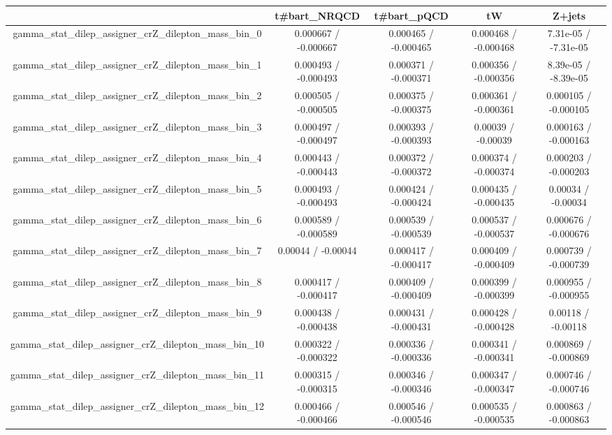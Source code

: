 \documentclass[10pt]{article}
\begin{document}
\begin{table}[htbp]
\begin{center}
\begin{tabular}{|c|c|c|c|c|}
\hline 
      & t#bar{t}_{NRQCD}      & t#bar{t}_{pQCD}      & tW      & Z+jets \\ 
\hline 
  gamma_stat_dilep_assigner_crZ_dilepton_mass_bin_0 & 0.000667 / -0.000667 & 0.000465 / -0.000465 & 0.000468 / -0.000468 & 7.31e-05 / -7.31e-05 \\ 
  gamma_stat_dilep_assigner_crZ_dilepton_mass_bin_1 & 0.000493 / -0.000493 & 0.000371 / -0.000371 & 0.000356 / -0.000356 & 8.39e-05 / -8.39e-05 \\ 
  gamma_stat_dilep_assigner_crZ_dilepton_mass_bin_2 & 0.000505 / -0.000505 & 0.000375 / -0.000375 & 0.000361 / -0.000361 & 0.000105 / -0.000105 \\ 
  gamma_stat_dilep_assigner_crZ_dilepton_mass_bin_3 & 0.000497 / -0.000497 & 0.000393 / -0.000393 & 0.00039 / -0.00039 & 0.000163 / -0.000163 \\ 
  gamma_stat_dilep_assigner_crZ_dilepton_mass_bin_4 & 0.000443 / -0.000443 & 0.000372 / -0.000372 & 0.000374 / -0.000374 & 0.000203 / -0.000203 \\ 
  gamma_stat_dilep_assigner_crZ_dilepton_mass_bin_5 & 0.000493 / -0.000493 & 0.000424 / -0.000424 & 0.000435 / -0.000435 & 0.00034 / -0.00034 \\ 
  gamma_stat_dilep_assigner_crZ_dilepton_mass_bin_6 & 0.000589 / -0.000589 & 0.000539 / -0.000539 & 0.000537 / -0.000537 & 0.000676 / -0.000676 \\ 
  gamma_stat_dilep_assigner_crZ_dilepton_mass_bin_7 & 0.00044 / -0.00044 & 0.000417 / -0.000417 & 0.000409 / -0.000409 & 0.000739 / -0.000739 \\ 
  gamma_stat_dilep_assigner_crZ_dilepton_mass_bin_8 & 0.000417 / -0.000417 & 0.000409 / -0.000409 & 0.000399 / -0.000399 & 0.000955 / -0.000955 \\ 
  gamma_stat_dilep_assigner_crZ_dilepton_mass_bin_9 & 0.000438 / -0.000438 & 0.000431 / -0.000431 & 0.000428 / -0.000428 & 0.00118 / -0.00118 \\ 
  gamma_stat_dilep_assigner_crZ_dilepton_mass_bin_10 & 0.000322 / -0.000322 & 0.000336 / -0.000336 & 0.000341 / -0.000341 & 0.000869 / -0.000869 \\ 
  gamma_stat_dilep_assigner_crZ_dilepton_mass_bin_11 & 0.000315 / -0.000315 & 0.000346 / -0.000346 & 0.000347 / -0.000347 & 0.000746 / -0.000746 \\ 
  gamma_stat_dilep_assigner_crZ_dilepton_mass_bin_12 & 0.000466 / -0.000466 & 0.000546 / -0.000546 & 0.000535 / -0.000535 & 0.000863 / -0.000863 \\ 

\end{tabular}
\end{center}
\end{table}
\end{document}
